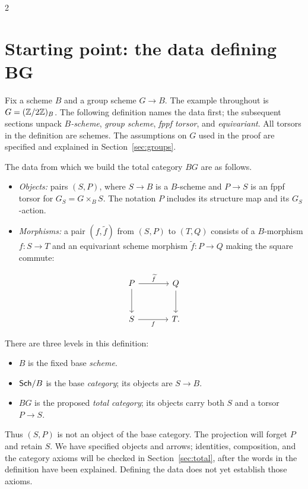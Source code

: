 \documentclass[12pt]{memoir}
\begin{document}
\begin{multicols}{2}
\section{Starting point: the data defining BG}\label{sec:start}

Fix a scheme $B$ and a group scheme $G\to B$. The example throughout is
$G=(\mathbb{Z}/2\mathbb{Z})_B$. The following definition names the data first; the
subsequent sections unpack \emph{$B$-scheme}, \emph{group scheme},
\emph{fppf torsor}, and \emph{equivariant}. All torsors in the definition
are schemes. The assumptions on $G$ used in the proof are specified
and explained in Section~\ref{sec:groups}.

\begin{Def}\label{def:BGdata}
The data from which we build the total category $BG$ are as follows.
\begin{itemize}
\item \emph{Objects:} pairs $(S,P)$, where $S\to B$ is a $B$-scheme
and $P\to S$ is an fppf torsor for $G_S=G\times_B S$. The notation
$P$ includes its structure map and its $G_S$-action.
\item \emph{Morphisms:} a pair $(f,\widetilde f)$ from $(S,P)$ to
$(T,Q)$ consists of a $B$-morphism $f:S\to T$ and an equivariant
scheme morphism $\widetilde f:P\to Q$ making the square commute:
\end{itemize}
\[
\begin{tikzcd}[column sep=large,row sep=large]
P \arrow[r,"\widetilde f"] \arrow[d] &Q \arrow[d]\\
S \arrow[r,"f"'] &T.
\end{tikzcd}
\]
\end{Def}

There are three levels in this definition:
\begin{itemize}
\item $B$ is the fixed base \emph{scheme}.
\item $\mathsf{Sch}/B$ is the base \emph{category}; its objects are $S\to B$.
\item $BG$ is the proposed \emph{total category}; its objects carry
both $S$ and a torsor $P\to S$.
\end{itemize}
Thus $(S,P)$ is not an object of the base category. The projection
will forget $P$ and retain $S$. We have specified objects and arrows;
identities, composition, and the category axioms will be checked in
Section~\ref{sec:total}, after the words in the definition have been
explained. Defining the data does not yet establish those axioms.


\end{multicols}
\end{document}
